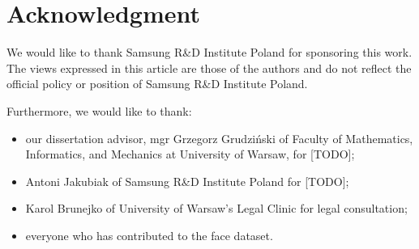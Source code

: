 \section*{Acknowledgment}
We would like to thank Samsung R\&D Institute Poland for sponsoring this work.
The views expressed in this article are those of the authors and do not reflect
the official policy or position of Samsung R\&D Institute Poland.

\bigskip \noindent
Furthermore, we would like to thank:
\begin{itemize}
    \item our dissertation advisor,  mgr Grzegorz Grudziński of Faculty of Mathematics,
          Informatics, and Mechanics at University of Warsaw, for [TODO];
    \item Antoni Jakubiak of Samsung R\&D Institute Poland for [TODO];
    \item Karol Brunejko of University of Warsaw's Legal Clinic for legal consultation;
    \item everyone who has contributed to the face dataset.
\end{itemize}
